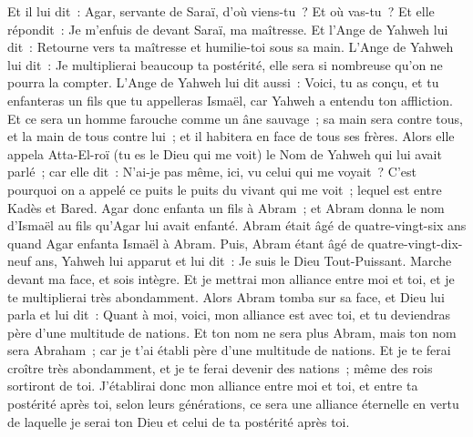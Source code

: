 \begin{multicols}{2}
Et il lui dit~: Agar, servante de Saraï, d'où viens-tu~? Et où vas-tu~? Et elle répondit~: Je m'enfuis de devant Saraï, ma maîtresse.
Et l'Ange de Yahweh lui dit~: Retourne vers ta maîtresse et humilie-toi sous sa main.
L'Ange de Yahweh lui dit~: Je multiplierai beaucoup ta postérité, elle sera si nombreuse qu'on ne pourra la compter.
L'Ange de Yahweh lui dit aussi~: Voici, tu as conçu, et tu enfanteras un fils que tu appelleras Ismaël, car Yahweh a entendu ton affliction.
Et ce sera un homme farouche comme un âne sauvage~; sa main sera contre tous, et la main de tous contre lui~; et il habitera en face de tous ses frères.
Alors elle appela Atta-El-roï (tu es le Dieu qui me voit) le Nom de Yahweh qui lui avait parlé~; car elle dit~: N'ai-je pas même, ici, vu celui qui me voyait~?
C'est pourquoi on a appelé ce puits le puits du vivant qui me voit~; lequel est entre Kadès et Bared.
Agar donc enfanta un fils à Abram~; et Abram donna le nom d'Ismaël au fils qu'Agar lui avait enfanté.
Abram était âgé de quatre-vingt-six ans quand Agar enfanta Ismaël à Abram.
\VerseOne{}Puis, Abram étant âgé de quatre-vingt-dix-neuf ans, Yahweh lui apparut et lui dit~: Je suis le Dieu Tout-Puissant. Marche devant ma face, et sois intègre.
Et je mettrai mon alliance entre moi et toi, et je te multiplierai très abondamment.
Alors Abram tomba sur sa face, et Dieu lui parla et lui dit~:
Quant à moi, voici, mon alliance est avec toi, et tu deviendras père d'une multitude de nations.
Et ton nom ne sera plus Abram, mais ton nom sera Abraham~; car je t'ai établi père d'une multitude de nations.
Et je te ferai croître très abondamment, et je te ferai devenir des nations~; même des rois sortiront de toi.
J'établirai donc mon alliance entre moi et toi, et entre ta postérité après toi, selon leurs générations, ce sera une alliance éternelle en vertu de laquelle je serai ton Dieu et celui de ta postérité après toi.

\end{multicols}
